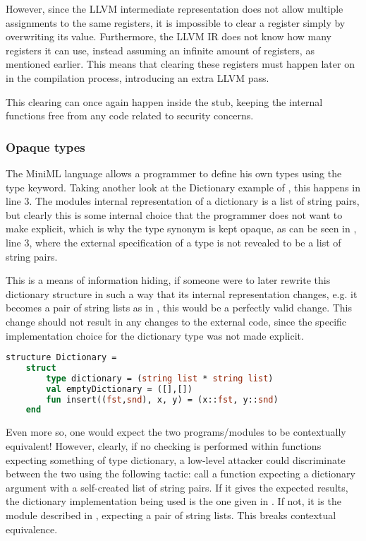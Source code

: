 However, since the LLVM intermediate representation does not allow multiple assignments to the same registers, it is impossible to clear a register simply by overwriting its value.
Furthermore, the LLVM IR does not know how many registers it can use, instead assuming an infinite amount of registers, as mentioned earlier. This means that clearing these registers must happen later on in the compilation process, introducing an extra LLVM pass.

This clearing can once again happen inside the stub, keeping the internal functions free from any code related to security concerns.

\subsubsection{Opaque types}

The \mbox{MiniML} language allows a programmer to define his own types using the type keyword. Taking another look at the Dictionary example of , this happens in line 3. The modules internal representation of a dictionary is a list of string pairs, but clearly this is some internal choice that the programmer does not want to make explicit, which is why the type synonym  is kept opaque, as can be seen in , line 3, where the external specification of a type is not revealed to be a list of string pairs.

This is a means of information hiding, if someone were to later rewrite this dictionary structure in such a way that its internal representation changes, e.g. it becomes a pair of string lists as in , this would be a perfectly valid change. This change should not result in any changes to the external code, since the specific implementation choice for the dictionary type was not made explicit.

\begin{lstlisting}[frame=single, language=ML, label={code:DictionaryStructureExample2},caption={[Alternative Dictionary Definition]An alternative structure defining a dictionary.}]
structure Dictionary =
    struct
        type dictionary = (string list * string list)
        val emptyDictionary = ([],[])
        fun insert((fst,snd), x, y) = (x::fst, y::snd)
    end
\end{lstlisting}

Even more so, one would expect the two programs/modules to be contextually equivalent! However, clearly, if no checking is performed within functions expecting something of type dictionary, a low-level attacker could discriminate between the two using the following tactic: call a function expecting a dictionary argument with a self-created list of string pairs. If it gives the expected results, the dictionary implementation being used is the one given in . If not, it is the module described in , expecting a pair of string lists. This breaks contextual equivalence.

